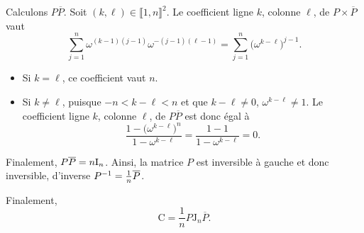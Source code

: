 \begin{solution}
    Calculons $P \overline{P}$. Soit $(k, \ell) \in \llbracket 1, n \rrbracket^2$. Le coefficient ligne $k$, colonne $\ell$, de $P \times \overline{P}$ vaut
    $$\sum_{j=1}^n \omega^{(k-1)(j-1)} \omega^{-(j-1)(\ell-1)} = \sum_{j=1}^n \big( \omega^{k-\ell} \big)^{j-1}.$$
    \begin{itemize}
        \item Si $k = \ell$, ce coefficient vaut $n$.
        \item Si $k \not= \ell$, puisque $-n < k-\ell < n$ et que $k - \ell \not= 0$, $\omega^{k-\ell} \not=1$. Le coefficient ligne $k$, colonne $\ell$, de $P \overline{P}$ est donc égal à 
        $$\frac{1 - \big( \omega^{k-\ell} \big)^n}{1 - \omega^{k-\ell}} = \frac{1-1}{1 - \omega^{k-\ell}} = 0.$$
    \end{itemize}
    Finalement, $P \overline{P} = n \mathrm{I}_n$. Ainsi, la matrice $P$ est inversible à gauche et donc inversible, d'inverse $P^{-1} = \frac{1}{n}\overline{P}$.
\end{solution}
Finalement, 
$$\mathrm{C} = \frac{1}{n} P \mathrm{J}_n \overline{P}.$$
